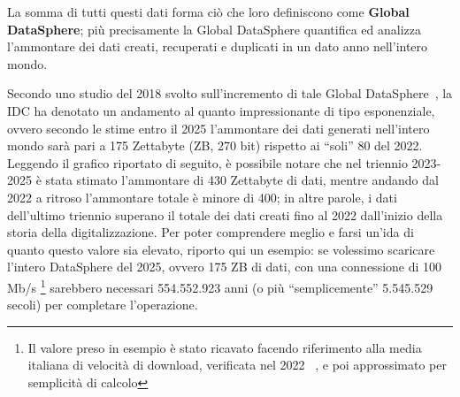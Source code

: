 La somma di tutti questi dati forma ciò che loro definiscono come \textbf{Global DataSphere}; più precisamente la Global DataSphere quantifica ed analizza l'ammontare dei dati creati, recuperati e duplicati in un dato anno nell'intero mondo.~\cite{datadrivendaily_dimension_table}

Secondo uno studio del 2018 svolto sull'incremento di tale Global DataSphere~\cite{idc_global_datasphere}, la IDC ha denotato un andamento al quanto impressionante di tipo esponenziale, ovvero secondo le stime entro il 2025 l'ammontare dei dati generati nell'intero mondo sarà pari a 175 Zettabyte (ZB, 270 bit) rispetto ai “soli” 80 del 2022. Leggendo il grafico riportato di seguito, è possibile notare che nel triennio 2023-2025 è stata stimato l'ammontare di 430 Zettabyte di dati, mentre andando dal 2022 a ritroso l'ammontare totale è minore di 400; in altre parole, i dati dell'ultimo triennio superano il totale dei dati creati fino al 2022 dall'inizio della storia della digitalizzazione. Per poter comprendere meglio e farsi un'ida di quanto questo valore sia elevato, riporto qui un esempio: se volessimo scaricare l'intero DataSphere del 2025, ovvero 175 ZB di dati, con una connessione di 100 Mb/s \footnote{Il valore preso in esempio è stato ricavato facendo riferimento alla media italiana di velocità di download, verificata nel 2022 ~\cite{github_speed_connection}, e poi approssimato per semplicità di calcolo} sarebbero necessari 554.552.923 anni (o più “semplicemente” 5.545.529 secoli) per completare l'operazione.

